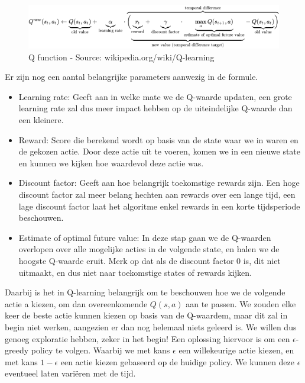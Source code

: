 \documentclass[11pt]{article}
\begin{document}
\begin{figure}[h]
\centering
\includegraphics[scale=0.70]{images/qformula.png}
\caption{Q function - Source: wikipedia.org/wiki/Q-learning}
\label{fig:qfunction}
\end{figure}

Er zijn nog een aantal belangrijke parameters aanwezig in de formule. 
\begin{itemize}
	\item Learning rate: Geeft aan in welke mate we de Q-waarde updaten, een grote learning rate zal dus meer impact hebben op de uiteindelijke Q-waarde dan een kleinere.
	\item Reward: Score die berekend wordt op basis van de state waar we in waren en de gekozen actie. Door deze actie uit te voeren, komen we in een nieuwe state en kunnen we kijken hoe waardevol deze actie was. 
	\item Discount factor: Geeft aan hoe belangrijk toekomstige rewards zijn. Een hoge discount factor zal meer belang hechten aan rewards over een lange tijd, een lage discount factor laat het algoritme enkel rewards in een korte tijdsperiode beschouwen.
	\item Estimate of optimal future value: In deze stap gaan we de Q-waarden overlopen over alle mogelijke acties in de volgende state, en halen we de hoogste Q-waarde eruit. Merk op dat als de discount factor 0 is, dit niet uitmaakt, en dus niet naar toekomstige states of rewards kijken.
\end{itemize}

Daarbij is het in Q-learning belangrijk om te beschouwen hoe we de volgende actie a kiezen, om dan overeenkomende $Q(s,a)$ aan te passen. We zouden elke keer de beste actie kunnen kiezen op basis van de Q-waardem, maar dit zal in begin niet werken, aangezien er dan nog helemaal niets geleerd is. We willen dus genoeg exploratie hebben, zeker in het begin! Een oplossing hiervoor is om een $\epsilon$-greedy policy te volgen. Waarbij we met kans $\epsilon$ een willekeurige actie kiezen, en met kans $1-\epsilon$ een actie kiezen gebaseerd op de huidige policy. We kunnen deze $\epsilon$ eventueel laten variëren met de tijd.\\
\end{document}
